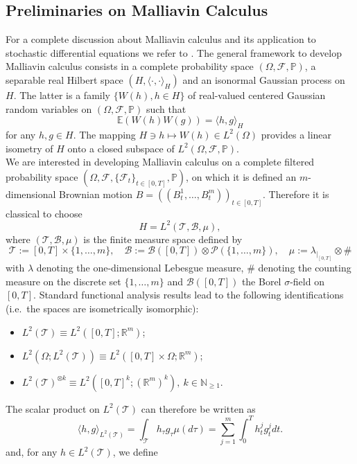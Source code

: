 \documentclass[11pt,a4paper]{article}
\newcommand{\R}{\mathbb{R}}
\newcommand{\E}{\mathbb{E}}
\theoremstyle{plain}
\begin{document}
\subsection{Preliminaries on Malliavin Calculus} For a complete discussion about Malliavin calculus and its application to stochastic differential equations we refer to \cite{nualart2006malliavin}. 
The general framework to develop Malliavin calculus consists in a complete probability space $(\Omega,\mathcal{F},\mathbb{P})$, a separable real Hilbert space $(H,\langle \cdot,\cdot \rangle_H)$ and an isonormal Gaussian process on $H$. The latter
 is a family $\{W(h), h \in H\}$ of real-valued centered Gaussian random variables on $(\Omega,\mathcal{F},\mathbb{P})$ such that \begin{equation*}
        \E(W(h)W(g)) = \langle h,g \rangle_H 
    \end{equation*} 
for any $h,g \in H$. The mapping $H \ni h \mapsto W(h) \in L^2(\Omega)$ provides a linear isometry of $H$ onto a closed subspace of $L^2(\Omega,\mathcal{F},\mathbb{P})$. \\
We are interested in developing Malliavin calculus on a complete filtered probability space $(\Omega,\mathcal{F},\{\mathcal{F}_t\}_{t \in [0,T]},\mathbb{P})$, on which it is defined an $m$-dimensional Brownian motion \linebreak $B=((B^1_t,\dots,B^m_t))_{t \in [0,T]}$. 
Therefore it is classical to choose \begin{equation*}
    H=L^2(\mathcal{T},\mathscr{B},\mu),
\end{equation*} 
where $(\mathcal{T},\mathscr{B},\mu)$ is the finite measure space defined by 
\begin{equation*}
    \mathcal{T}:= [0,T] \times \{1,\dots,m\}, \quad \mathscr{B}:= \mathcal{B}([0,T])\otimes \mathcal{P}(\{1,\dots,m\}), \quad \mu:= \lambda_{|_{[0,T]}} \otimes \#
\end{equation*} with $\lambda$ denoting the one-dimensional Lebesgue measure, $\#$ denoting the counting measure on the discrete set $\{1,\dots,m\}$ and $\mathcal{B}([0,T])$ the Borel $\sigma$-field on $[0,T]$. Standard functional analysis results lead to the following identifications (i.e.\ the spaces are isometrically isomorphic): \begin{itemize}
    \item $L^2(\mathcal{T}) \equiv L^2([0,T];\R^m)$;
    \item $L^2(\Omega;L^2(\mathcal{T})) \equiv L^2([0,T]\times\Omega;\R^m)$;
    \item $L^2(\mathcal{T})^{\otimes{k}} \equiv L^2([0,T]^k; (\R^{m})^{k}), \ k\in \mathbb{N}_{\ge 1}$.
\end{itemize}
The scalar product on $L^2(\mathcal{T})$ can therefore be written as \begin{equation*}
    \langle h,g \rangle_{L^2(\mathcal{T})} = \int_{\mathcal{T}} h_\tau g_\tau \mu(d\tau) = \sum_{j=1}^m \int_0^T h_t^j g_t^j dt.
\end{equation*} and, for any $h\in L^2(\mathcal{T})$, we define 
\end{document}
